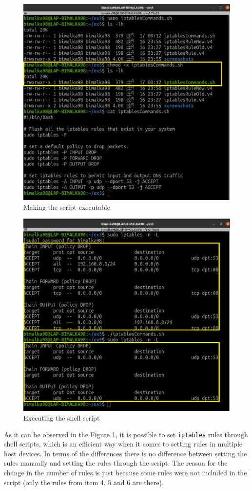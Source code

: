 \documentclass[11pt,letterpaper]{article}
\newenvironment{answer}{\em \color{blue} \begin{adjustwidth}{1cm}{1cm}}{\end{adjustwidth}}
\begin{document}
\begin{enumerate}
\begin{answer}
			\begin{figure}[H]
				\centering
				\includegraphics[width=0.65\columnwidth]{images/part1/10_2.png}
				\caption{Making the script executable}
			\end{figure}
		
			\begin{figure}[H]
				\centering
				\includegraphics[width=0.65\columnwidth]{images/part1/10_3.png}
				\caption{Executing the shell script}
				\label{scripting}
			\end{figure}
		
		As it can be observed in the Figure \ref{scripting}, it is possible to set {\tt iptables} rules through shell scripts, which is an efficient way when it comes to setting rules in multiple host devices. In terms of the differences there is no difference between setting the rules manually and setting the rules through the script. The reason for the change in the number of rules is just because some rules were not included in the script (only the rules from item 4, 5 and 6 are there).
		\end{answer}
				

\end{enumerate}
\end{document}
